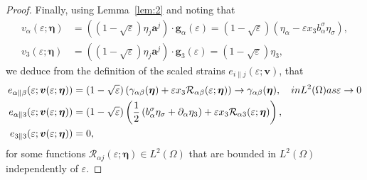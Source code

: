 \documentclass{amsart}
\begin{document}
\begin{proof}
Finally, using Lemma~\ref{lem:2} and noting that
\begin{align*}
	v_\alpha (\varepsilon; \bm{\eta}) &= \left( (1-\sqrt{\varepsilon} ) \eta_j \bm{a}^j \right) \cdot \bm{g}_\alpha (\varepsilon) = (1- \sqrt{\varepsilon}) \left( \eta_\alpha - \varepsilon x_3 b^\sigma_\alpha \eta_\sigma \right), \\
	v_3 (\varepsilon; \bm{\eta}) &= \left( (1-\sqrt{\varepsilon} ) \eta_j \bm{a}^j \right) \cdot \bm{g}_3 (\varepsilon) = (1- \sqrt{\varepsilon}) \eta_3,
\end{align*}
we deduce from the definition of the scaled strains $e_{i\|j}(\varepsilon;\bm{v})$, that
\begin{equation}
	\label{conv2}
	\begin{aligned}
	e_{\alpha\|\beta}(\varepsilon; \bm{v}(\varepsilon;\bm{\eta})) &= (1-\sqrt{\varepsilon})\left(\gamma_{\alpha\beta}(\bm{\eta}) + \varepsilon x_3 \mathcal{R}_{\alpha\beta}(\varepsilon;\bm{\eta})\right) \to \gamma_{\alpha\beta}(\bm{\eta}),\quad\textup{ in }L^2(\Omega)\textup{ as }\varepsilon\to 0\\
	e_{\alpha\|3}(\varepsilon;\bm{v}(\varepsilon;\bm{\eta})) &= (1-\sqrt{\varepsilon}) \left(\dfrac{1}{2}\left(b^\sigma_\alpha \eta_\sigma + \partial_\alpha \eta_3\right)+ \varepsilon x_3 \mathcal{R}_{\alpha3}(\varepsilon;\bm{\eta})\right),\\
	e_{3\|3}(\varepsilon;\bm{v}(\varepsilon; \bm{\eta})) &= 0,
\end{aligned}
\end{equation}
for some functions $\mathcal{R}_{\alpha j} (\varepsilon;\bm{\eta}) \in L^2(\Omega)$ that are bounded in $L^2(\Omega)$ independently of $\varepsilon$.


\end{proof}
\end{document}
